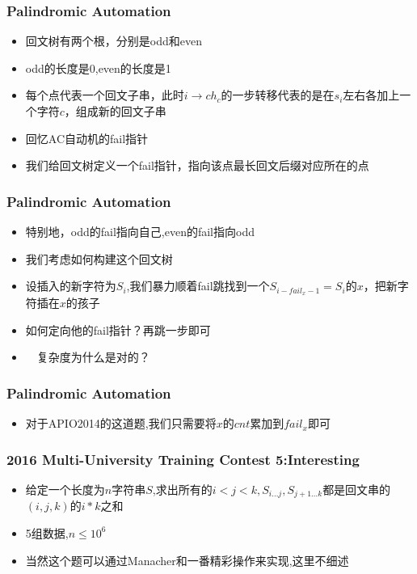 \documentclass[notheorems]{beamer}
\begin{document}
\begin{frame}
\frametitle{Palindromic Automation}
\begin{itemize}
\item 回文树有两个根，分别是odd和even
\item odd的长度是0,even的长度是1
\pause
\item 每个点代表一个回文子串，此时$i \to ch_c$的一步转移代表的是在$s_i$左右各加上一个字符$c$，组成新的回文子串
\pause
\item 回忆AC自动机的fail指针
\item 我们给回文树定义一个fail指针，指向该点最长回文后缀对应所在的点
\end{itemize}
\end{frame}

\begin{frame}
\frametitle{Palindromic Automation}
\begin{itemize}
\item 特别地，odd的fail指向自己,even的fail指向odd
\pause
\item 我们考虑如何构建这个回文树
\item 设插入的新字符为$S_i$,我们暴力顺着fail跳找到一个$S_{i-fail_x-1}=S_{i}$的$x$，把新字符插在$x$的孩子
\pause
\item 如何定向他的fail指针？再跳一步即可
\pause
\item　复杂度为什么是对的？
\end{itemize}
\end{frame}

\begin{frame}
\frametitle{Palindromic Automation}
\begin{itemize}
\item 对于APIO2014的这道题,我们只需要将$x$的$cnt$累加到$fail_x$即可
\end{itemize}
\end{frame}


\begin{frame}
\frametitle{2016 Multi-University Training Contest 5:Interesting}
\begin{itemize}
\item 给定一个长度为$n$字符串$S$,求出所有的$i < j < k, S_{i \ldots j},S_{j+1 \ldots k}$都是回文串的$(i,j,k)$的$i*k$之和
\item 5组数据,$n\leq 10^6$ 
\pause
\item 当然这个题可以通过Manacher和一番精彩操作来实现,这里不细述
\end{itemize}
\end{frame}
\end{document}
